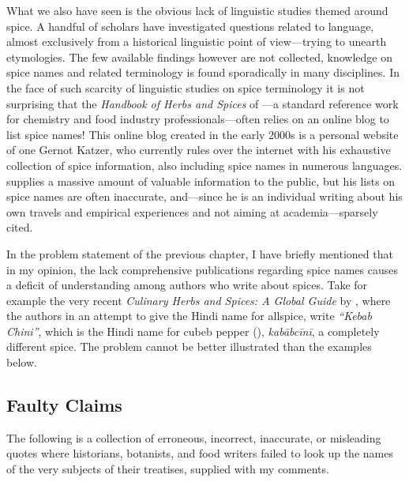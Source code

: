 What we also have seen is the obvious lack of linguistic studies themed around spice. A handful of scholars have investigated questions related to language, almost exclusively from a historical linguistic point of view---trying to unearth etymologies. The few available findings however are not collected, knowledge on spice names and related terminology is found sporadically in many disciplines. In the face of such scarcity of linguistic studies on spice terminology it is not surprising that the \textit{Handbook of Herbs and Spices} of \textcite{peter_handbook_2012}---a standard reference work for chemistry and food industry professionals---often relies on an online blog to list spice names! This online blog created in the early 2000s is a personal website of one Gernot Katzer, who currently rules over the internet with his exhaustive collection of spice information, also including spice names in numerous languages. \textcite{katzer_gernot_2012} supplies a massive amount of valuable information to the public, but his lists on spice names are often inaccurate, and---since he is an individual writing about his own travels and empirical experiences and not aiming at academia---sparsely cited.

In the problem statement of the previous chapter, I have briefly mentioned that in my opinion, the lack comprehensive publications regarding spice names causes a deficit of understanding among authors who write about spices. Take for example the very recent \textit{Culinary Herbs and Spices: A Global Guide} by \textcite[11]{opara_culinary_2021}, where the authors in an attempt to give the Hindi name for allspice, write \textit{``Kebab Chini''}, which is the Hindi name for cubeb pepper (),  \textit{kabābcīnī}, a completely different spice. The problem cannot be better illustrated than the examples below.

\subsection{Faulty Claims}

The following is a collection of erroneous, incorrect, inaccurate, or misleading quotes where historians, botanists, and food writers failed to look up the names of the very subjects of their treatises, supplied with my comments.

